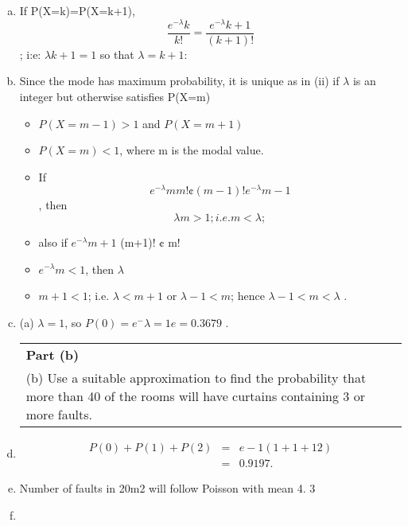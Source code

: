 \documentclass[a4paper,12pt]{article}
\begin{document}
\begin{enumerate}[(a)]
\item If P(X=k)=P(X=k+1), \[\frac{e^{-\lambda}k}{
k!} = \frac{e^{-\lambda}k+1}{(k+1)!}\] ; i:e: ${\lambda}
k+1 = 1$ so that ${\lambda} = k + 1:$
\item Since the mode has maximum probability, it is unique as in (ii) if ${\lambda}$ is an integer but otherwise
satisfies P(X=m)

\begin{itemize}
    \item $P(X=m-1) > 1$ and $P(X=m+1)$
\item $P(X=m) < 1$, where m is the modal value.
\item If \[e^{-\lambda}m
m! ¢ (m-1)!
e^{-\lambda}m-1 \], then \[{\lambda}
m > 1; i.e. m < {\lambda};\]
\item also if $e^{-\lambda}m+1$
(m+1)! ¢ m!
\item $e^{-\lambda}m < 1$, then ${\lambda}$
\item $m+1 < 1$; i.e. ${\lambda} < m + 1$ or ${\lambda} - 1 < m $;
hence ${\lambda} - 1 < m < {\lambda}$ .
\end{itemize}

\item (a) ${\lambda} = 1$, so $P(0)=e^-{\lambda}=1
e =0.3679$ .
\begin{table}[ht!]
     \centering
     \begin{tabular}{|p{15cm}|}
     \hline        
 \noindent \textbf{Part (b)}\\
\noindent (b) Use a suitable approximation to find the probability that more than 40 of the rooms will have curtains containing 3 or more faults.
 
\\ \hline
 \end{tabular}
\end{table}\item 
\begin{eqnarray}
P(0)+P(1)+P(2)&=&e-1(1+1+1
2)\\ &=& 0.9197 .
\end{eqnarray}
\item Number of faults in 20m2 will follow Poisson with mean 4.
3
\item 


\end{enumerate}
\end{document}
